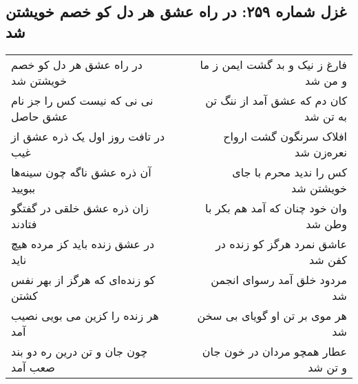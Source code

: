 \begin{center}
\section*{غزل شماره ۲۵۹: در راه عشق هر دل کو خصم خویشتن شد}
\label{sec:259}
\begin{longtable}{l p{0.5cm} r}
در راه عشق هر دل کو خصم خویشتن شد
&&
فارغ ز نیک و بد گشت ایمن ز ما و من شد
\\
نی نی که نیست کس را جز نام عشق حاصل
&&
کان دم که عشق آمد از ننگ تن به تن شد
\\
در تافت روز اول یک ذره عشق از غیب
&&
افلاک سرنگون گشت ارواح نعره‌زن شد
\\
آن ذره عشق ناگه چون سینه‌ها ببویید
&&
کس را ندید محرم با جای خویشتن شد
\\
زان ذره عشق خلقی در گفتگو فتادند
&&
وان خود چنان که آمد هم بکر با وطن شد
\\
در عشق زنده باید کز مرده هیچ ناید
&&
عاشق نمرد هرگز کو زنده در کفن شد
\\
کو زنده‌ای که هرگز از بهر نفس کشتن
&&
مردود خلق آمد رسوای انجمن شد
\\
هر زنده را کزین می بویی نصیب آمد
&&
هر موی بر تن او گویای بی سخن شد
\\
چون جان و تن درین ره دو بند صعب آمد
&&
عطار همچو مردان در خون جان و تن شد
\\
\end{longtable}
\end{center}
